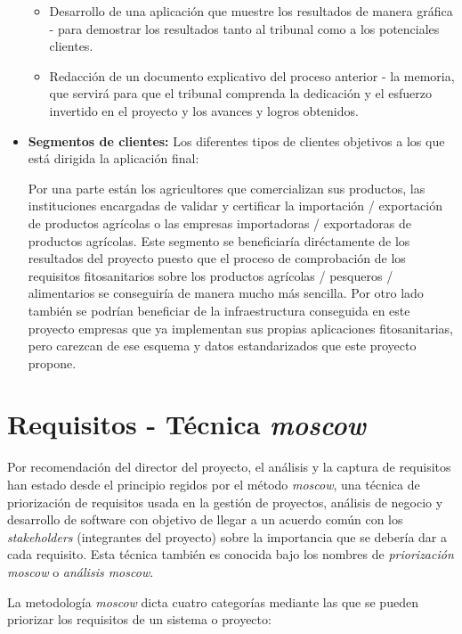 \begin{itemize}
\begin{itemize}
\item Desarrollo de una aplicación que muestre los resultados de manera gráfica - para demostrar los resultados tanto al tribunal como a los potenciales clientes.
\item Redacción de un documento explicativo del proceso anterior - la memoria, que servirá para que el tribunal comprenda la dedicación y el esfuerzo invertido en el proyecto y los avances y logros obtenidos.
\end{itemize}
\item \textbf{Segmentos de clientes:} Los diferentes tipos de clientes objetivos a los que está dirigida la aplicación final: \par Por una parte están los  agricultores que comercializan sus productos, las instituciones encargadas de validar y certificar la importación / exportación  de productos agrícolas o las empresas importadoras / exportadoras de productos agrícolas. Este segmento se beneficiaría diréctamente de los resultados del proyecto puesto que el proceso de comprobación de los requisitos fitosanitarios sobre los productos agrícolas / pesqueros / alimentarios se conseguiría de manera mucho más sencilla. Por otro lado también se podrían beneficiar de la infraestructura conseguida en este proyecto empresas que ya implementan sus propias aplicaciones fitosanitarias, pero carezcan de ese esquema y datos estandarizados que este proyecto propone.



\end{itemize}


\section{Requisitos - Técnica \textit{\gls{moscow}}} \label{phytoscheme.requisitos}
\par 
Por recomendación del director del proyecto, el análisis y la captura de requisitos han estado desde el principio  regidos por el método \textit{\gls{moscow}}, una técnica de priorización de requisitos usada en la gestión de proyectos, análisis de negocio y desarrollo de software con objetivo de llegar a un acuerdo común con los \textit{stakeholders} (integrantes del proyecto) sobre la importancia que se debería dar a cada requisito. Esta técnica también es conocida bajo los nombres de \textit{priorización \gls{moscow}} o \textit{análisis \gls{moscow}}.
\par
La metodología \textit{\gls{moscow}} dicta cuatro categorías mediante las que se pueden priorizar los requisitos de un sistema o proyecto: 

